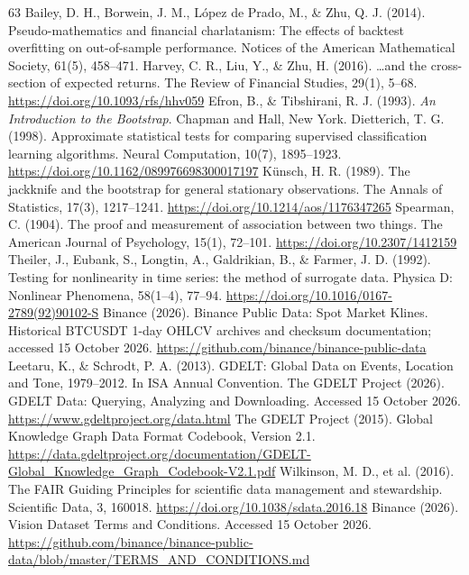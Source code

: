 \begin{thebibliography}{63}
     Bailey, D. H., Borwein, J. M., L{\'o}pez de Prado, M., \& Zhu, Q. J. (2014). Pseudo-mathematics and financial charlatanism: The effects of backtest overfitting on out-of-sample performance. Notices of the American Mathematical Society, 61(5), 458--471.
     Harvey, C. R., Liu, Y., \& Zhu, H. (2016). \ldots and the cross-section of expected returns. The Review of Financial Studies, 29(1), 5--68. \url{https://doi.org/10.1093/rfs/hhv059}
     Efron, B., \& Tibshirani, R. J. (1993). \emph{An Introduction to the Bootstrap}. Chapman and Hall, New York.
     Dietterich, T. G. (1998). Approximate statistical tests for comparing supervised classification learning algorithms. Neural Computation, 10(7), 1895--1923. \url{https://doi.org/10.1162/089976698300017197}
     K{\"u}nsch, H. R. (1989). The jackknife and the bootstrap for general stationary observations. The Annals of Statistics, 17(3), 1217--1241. \url{https://doi.org/10.1214/aos/1176347265}
     Spearman, C. (1904). The proof and measurement of association between two things. The American Journal of Psychology, 15(1), 72--101. \url{https://doi.org/10.2307/1412159}
     Theiler, J., Eubank, S., Longtin, A., Galdrikian, B., \& Farmer, J. D. (1992). Testing for nonlinearity in time series: the method of surrogate data. Physica D: Nonlinear Phenomena, 58(1--4), 77--94. \url{https://doi.org/10.1016/0167-2789(92)90102-S}
     Binance (2026). Binance Public Data: Spot Market Klines. Historical BTCUSDT 1-day OHLCV archives and checksum documentation; accessed 15 October 2026. \url{https://github.com/binance/binance-public-data}
     Leetaru, K., \& Schrodt, P. A. (2013). GDELT: Global Data on Events, Location and Tone, 1979--2012. In ISA Annual Convention.
     The GDELT Project (2026). GDELT Data: Querying, Analyzing and Downloading. Accessed 15 October 2026. \url{https://www.gdeltproject.org/data.html}
     The GDELT Project (2015). Global Knowledge Graph Data Format Codebook, Version 2.1. \url{https://data.gdeltproject.org/documentation/GDELT-Global_Knowledge_Graph_Codebook-V2.1.pdf}
     Wilkinson, M. D., et al. (2016). The FAIR Guiding Principles for scientific data management and stewardship. Scientific Data, 3, 160018. \url{https://doi.org/10.1038/sdata.2016.18}
     Binance (2026). Vision Dataset Terms and Conditions. Accessed 15 October 2026. \url{https://github.com/binance/binance-public-data/blob/master/TERMS_AND_CONDITIONS.md}

\end{thebibliography}

